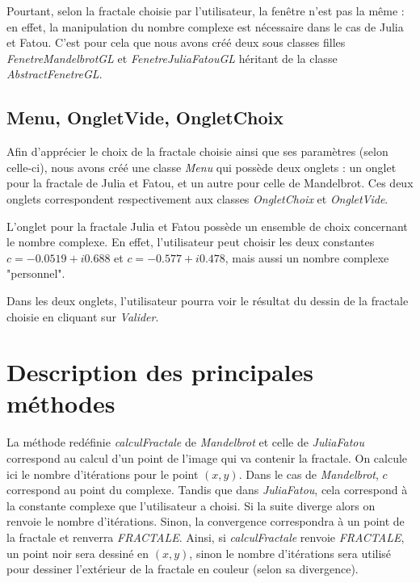 \documentclass[a4]{article}
\begin{document}
Pourtant, selon la fractale choisie par l'utilisateur, la fenêtre n'est pas la même : en effet, la manipulation du nombre complexe est nécessaire dans le cas de Julia et Fatou. 
C'est pour cela que nous avons créé deux sous classes filles \emph{FenetreMandelbrotGL} et \emph{FenetreJuliaFatouGL} héritant de la classe \emph {AbstractFenetreGL}. 

\subsection{Menu, OngletVide, OngletChoix}

Afin d'apprécier le choix de la fractale choisie ainsi que ses paramètres (selon celle-ci), nous avons créé une classe \emph{Menu} qui possède deux onglets : 
un onglet pour la fractale de Julia et Fatou, et un autre pour celle de Mandelbrot. 
Ces deux onglets correspondent respectivement aux classes \emph{OngletChoix} et \emph{OngletVide}.
\vspace{1\baselineskip}  

L'onglet pour la fractale Julia et Fatou possède un ensemble de choix concernant le nombre complexe. 
En effet, l'utilisateur peut choisir les deux constantes $c=-0.0519 + i0.688$ et $c=-0.577 + i0.478$, mais aussi un nombre complexe "personnel". 
\vspace{1\baselineskip}

Dans les deux onglets, l'utilisateur pourra voir le résultat du dessin de la fractale choisie en cliquant sur \emph{Valider}.

\section{Description des principales méthodes}

La méthode redéfinie \emph{calculFractale} de \emph{Mandelbrot} et celle de \emph{JuliaFatou} correspond au calcul d'un point de l'image qui va contenir la fractale. 
On calcule ici le nombre d'itérations pour le point $(x,y)$. 
Dans le cas de \emph{Mandelbrot}, $c$ correspond au point du complexe. Tandis que dans \emph{JuliaFatou}, cela correspond à la constante complexe que l'utilisateur a choisi. 
Si la suite diverge alors on renvoie le nombre d'itérations. 
Sinon, la convergence correspondra à un point de la fractale et renverra \emph{FRACTALE}. 
Ainsi, si \emph{calculFractale} renvoie \emph{FRACTALE}, un point noir sera dessiné en $(x,y)$, sinon le nombre d'itérations sera utilisé pour dessiner l'extérieur de la fractale en couleur (selon sa divergence). 
\end{document}
